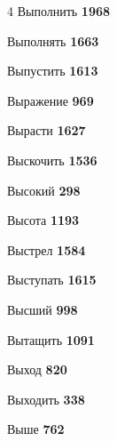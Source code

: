 \begin{multicols}{4}
\noindent Выполнить \dotfill \textbf{\color{secondary} 1968}\par
\noindent Выполнять \dotfill \textbf{\color{secondary} 1663}\par
\noindent Выпустить \dotfill \textbf{\color{secondary} 1613}\par
\noindent Выражение \dotfill \textbf{\color{secondary} 969}\par
\noindent Вырасти \dotfill \textbf{\color{secondary} 1627}\par
\noindent Выскочить \dotfill \textbf{\color{secondary} 1536}\par
\noindent Высокий \dotfill \textbf{\color{secondary} 298}\par
\noindent Высота \dotfill \textbf{\color{secondary} 1193}\par
\noindent Выстрел \dotfill \textbf{\color{secondary} 1584}\par
\noindent Выступать \dotfill \textbf{\color{secondary} 1615}\par
\noindent Высший \dotfill \textbf{\color{secondary} 998}\par
\noindent Вытащить \dotfill \textbf{\color{secondary} 1091}\par
\noindent Выход \dotfill \textbf{\color{secondary} 820}\par
\noindent Выходить \dotfill \textbf{\color{secondary} 338}\par
\noindent Выше \dotfill \textbf{\color{secondary} 762}\par


\end{multicols}
